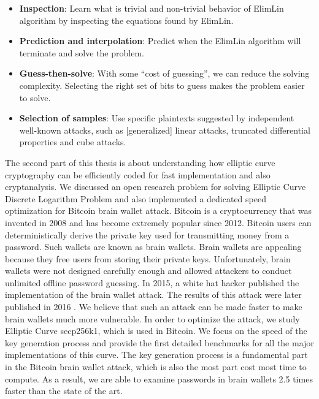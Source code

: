 \begin{itemize}
	\item \textbf{Inspection}: Learn what is trivial and non-trivial behavior of ElimLin algorithm by inspecting the equations found by ElimLin.
	\item \textbf{Prediction and interpolation}: Predict when the ElimLin algorithm will terminate and solve the problem.
	\item \textbf{Guess-then-solve}: With some ``cost of guessing'', we can reduce the solving complexity. Selecting the right set of bits to guess makes the problem easier to solve.
	\item \textbf{Selection of samples}: Use specific plaintexts suggested by independent well-known attacks,
	such as [generalized] linear attacks, truncated differential properties and cube attacks.
\end{itemize}

The second part of this thesis is about understanding how elliptic curve cryptography can be efficiently coded for fast implementation and also cryptanalysis. We discussed an open research problem for solving Elliptic Curve Discrete Logarithm Problem and also implemented a dedicated speed optimization for Bitcoin brain wallet attack. Bitcoin is a cryptocurrency that was invented in 2008 and has become extremely popular since 2012. Bitcoin users can deterministically derive the private key used for transmitting money from a password. Such wallets are known as brain wallets. Brain wallets are appealing because they free users from storing their private keys. Unfortunately, brain wallets were not designed carefully enough and allowed attackers to conduct unlimited offline password guessing. In 2015, a white hat hacker published the implementation of the brain wallet attack. The results of this attack were later published in 2016 \cite{vasek2016bitcoin}. We believe that such an attack can be made faster to make brain wallets much more vulnerable. In order to optimize the attack, we study Elliptic Curve secp256k1, which is used in Bitcoin. We focus on the speed of the key generation process and provide the first detailed benchmarks for all the major implementations of this curve. The key generation process is a fundamental part in the Bitcoin brain wallet attack, which is also the most part cost most time to compute. As a result, we are able to examine passwords in brain wallets 2.5 times faster than the state of the art.